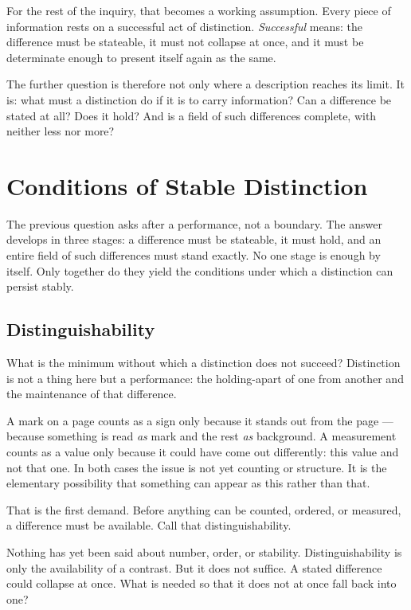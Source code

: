 \documentclass[11pt,a4paper]{book}
\begin{document}
For the rest of the inquiry, that becomes a working assumption. Every piece
of information rests on a successful act of distinction. \emph{Successful}
means: the difference must be stateable, it must not collapse at once, and
it must be determinate enough to present itself again as the same.

The further question is therefore not only where a description reaches its
limit. It is: what must a distinction do if it is to carry information? Can
a difference be stated at all? Does it hold? And is a field of such
differences complete, with neither less nor more?

\chapter{Conditions of Stable Distinction}
\label{ch:distinguishability}

The previous question asks after a performance, not a boundary. The answer
develops in three stages: a difference must be stateable, it must hold, and
an entire field of such differences must stand exactly. No one stage is
enough by itself. Only together do they yield the conditions under which a
distinction can persist stably.

\section{Distinguishability}

What is the minimum without which a distinction does not succeed?
Distinction is not a thing here but a performance: the holding-apart of one
from another and the maintenance of that difference.

A mark on a page counts as a sign only because it stands out from the page
--- because something is read \emph{as} mark and the rest \emph{as}
background. A measurement counts as a value only because it could have come
out differently: this value and not that one. In both cases the issue is
not yet counting or structure. It is the elementary possibility that
something can appear as this rather than that.

That is the first demand. Before anything can be counted, ordered, or
measured, a difference must be available. Call that distinguishability.

Nothing has yet been said about number, order, or stability.
Distinguishability is only the availability of a contrast. But it does not
suffice. A stated difference could collapse at once. What is needed so that
it does not at once fall back into one?
\end{document}
